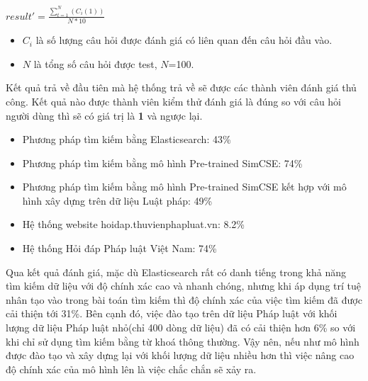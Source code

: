 \begin{center}
	$result' = \frac{\sum_{t=1}^{N}(C_{i}(1))}{N*10}$    
\end{center}
\begin{itemize}
	\item $C_{i}$  là số lượng câu hỏi được đánh giá có liên quan đến câu hỏi đầu vào.
	\item $N$ là tổng số câu hỏi được test, $N$=100.
	
\end{itemize}
Kết quả trả về đầu tiên mà hệ thống trả về sẽ được các thành viên đánh giá thủ công. Kết quả nào được thành viên kiểm thử đánh giá là đúng so với câu hỏi người dùng thì sẽ có giá trị là \textbf{1} và ngược lại.

\begin{itemize}
	\item Phương pháp tìm kiếm bằng Elasticsearch: 43\%
	\item Phương pháp tìm kiếm bằng mô hình Pre-trained SimCSE: 74\%
	\item Phương pháp tìm kiếm bằng mô hình Pre-trained SimCSE kết hợp với mô hình xây dựng trên dữ liệu Luật pháp: 49\%
	\item Hệ thống website hoidap.thuvienphapluat.vn: 8.2\% 
	\item Hệ thống Hỏi đáp Pháp luật Việt Nam: 74\% 
	
\end{itemize}

Qua kết quả đánh giá, mặc dù Elasticsearch rất có danh tiếng trong khả năng tìm kiếm dữ liệu với độ chính xác cao và nhanh chóng, nhưng khi áp dụng trí tuệ nhân tạo vào trong bài toán tìm kiếm thì độ chính xác của việc tìm kiếm đã được cải thiện tới 31\%. Bên cạnh đó, việc đào tạo trên dữ liệu Pháp luật với khối lượng dữ liệu Pháp luật nhỏ(chỉ 400 dòng dữ liệu) đã có cải thiện hơn 6\% so với khi chỉ sử dụng tìm kiếm bằng từ khoá thông thường. Vậy nên, nếu như mô hình được đào tạo và xây dựng lại với khối lượng dữ liệu nhiều hơn thì việc nâng cao độ chính xác của mô hình lên là việc chắc chắn sẽ xảy ra. 